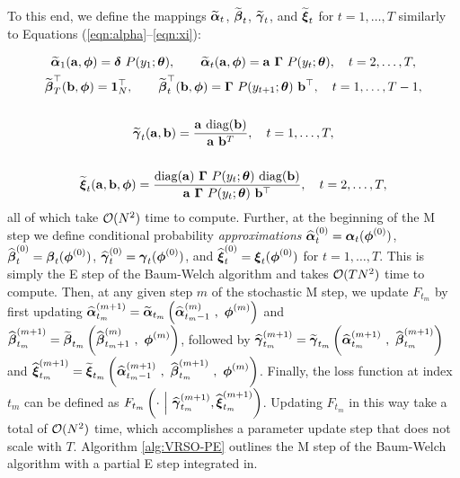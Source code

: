 To this end, we define the mappings $\widetilde {\boldsymbol{\alpha}}_t$, $\widetilde {\boldsymbol{\beta}}_t$, $\widetilde {\boldsymbol{\gamma}}_t$, and $\widetilde {\boldsymbol{\xi}}_t$ for $t = 1,\ldots,T$ similarly to Equations (\ref{eqn:alpha}--\ref{eqn:xi}):

\begin{gather}
    \widetilde {\boldsymbol{\alpha}}_1(\mathbf{a},\boldsymbol{\phi}) = \boldsymbol{\delta} ~ P(y_1;\boldsymbol{\theta}), \qquad \widetilde {\boldsymbol{\alpha}}_t(\mathbf{a},\boldsymbol{\phi}) = \mathbf{a} ~ \boldsymbol{\Gamma} ~ P(y_t;\boldsymbol{\theta}), \quad t = 2,\ldots,T, \label{eqn:tilde_alpha} \\
    \widetilde {\boldsymbol{\beta}}^\top_T(\mathbf{b},\boldsymbol{\phi}) = \mathbf{1}_N^\top, \qquad \widetilde {\boldsymbol{\beta}}^\top_t(\mathbf{b},\boldsymbol{\phi}) = \boldsymbol{\Gamma} ~ P(y_{t+1};\boldsymbol{\theta}) ~ \mathbf{b}^\top, \quad t = 1,\ldots,T-1, \label{eqn:tilde_beta} \\ \nonumber \\
    \widetilde {\boldsymbol{\gamma}}_t(\mathbf{a},\mathbf{b}) = \frac{\mathbf{a} ~ \text{diag}(\mathbf{b})}{\mathbf{a} ~ \mathbf{b}^T}, \quad t = 1,\ldots,T, \label{eqn:tilde_gamma} \\ \nonumber \\
    \widetilde {\boldsymbol{\xi}}_{t}(\mathbf{a},\mathbf{b},\boldsymbol{\phi}) = \frac{\text{diag}(\mathbf{a}) ~ \boldsymbol{\Gamma} ~ P(y_t;\boldsymbol{\theta}) ~ \text{diag}(\mathbf{b})}{\mathbf{a} ~ \boldsymbol{\Gamma} ~ P(y_{t};\boldsymbol{\theta}) ~ \mathbf{b}^\top}, \quad t = 2,\ldots,T \label{eqn:tilde_xi},
\end{gather}
%
all of which take $\mathcal{O}(N^2)$ time to compute. Further, at the beginning of the M step we define conditional probability \textit{approximations} $\widehat {\boldsymbol{\alpha}}_{t}^{(0)} = \boldsymbol{\alpha}_t(\boldsymbol{\phi}^{(0)})$, $\widehat {\boldsymbol{\beta}}_{t}^{(0)} = \boldsymbol{\beta}_t(\boldsymbol{\phi}^{(0)})$, $\widehat {\boldsymbol{\gamma}}_{t}^{(0)} = \boldsymbol{\gamma}_t(\boldsymbol{\phi}^{(0)})$, and $\widehat {\boldsymbol{\xi}}_{t}^{(0)} = \boldsymbol{\xi}_t(\boldsymbol{\phi}^{(0)})$ for $t = 1,\ldots,T$. This is simply the E step of the Baum-Welch algorithm and takes $\mathcal{O}(TN^2)$ time to compute. Then, at any given step $m$ of the stochastic M step, we update $F_{t_m}$ by first updating $\widehat {\boldsymbol{\alpha}}_{t_m}^{(m+1)} = \widetilde {\boldsymbol{\alpha}}_{t_m}\left(\widehat {\boldsymbol{\alpha}}_{t_m-1}^{(m)} ~,~ \boldsymbol{\phi}^{(m)}\right)$ and $\widehat {\boldsymbol{\beta}}_{t_m}^{(m+1)} = \widetilde {\boldsymbol{\beta}}_{t_m}\left(\widehat {\boldsymbol{\beta}}_{t_m+1}^{(m)} ~,~ \boldsymbol{\phi}^{(m)}\right)$, followed by $\widehat {\boldsymbol{\gamma}}_{t_m}^{(m+1)} = \widetilde {\boldsymbol{\gamma}}_{t_m}\left(\widehat {\boldsymbol{\alpha}}_{t_m}^{(m+1)} ~,~ \widehat {\boldsymbol{\beta}}_{t_m}^{(m+1)}\right)$ and $\widehat {\boldsymbol{\xi}}_{t_m}^{(m+1)} = \widetilde {\boldsymbol{\xi}}_{t_m}\left(\widehat {\boldsymbol{\alpha}}_{t_m-1}^{(m+1)} ~,~ \widehat {\boldsymbol{\beta}}_{t_m}^{(m+1)} ~,~ \boldsymbol{\phi}^{(m)}\right)$. Finally, the loss function at index $t_m$ can be defined as $F_{t_m}\left(\cdot ~ \Big | ~ \widehat {\boldsymbol{\gamma}}_{t_m}^{(m+1)},\widehat {\boldsymbol{\xi}}_{t_m}^{(m+1)}\right)$. Updating $F_{t_m}$ in this way take a total of $\mathcal{O}(N^2)$ time, which accomplishes a parameter update step that does not scale with $T$. Algorithm \ref{alg:VRSO-PE} outlines the M step of the Baum-Welch algorithm with a partial E step integrated in. %

